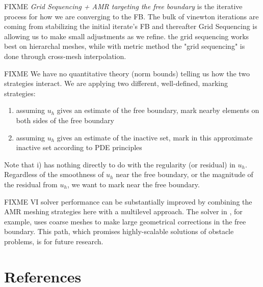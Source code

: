 \documentclass[]{interact}
\theoremstyle{plain}%
\theoremstyle{definition}
\theoremstyle{remark}
\begin{document}
FIXME \emph{Grid Sequencing + AMR targeting the free boundary} is the iterative process for how we are converging to the FB.  The bulk of vinewton iterations are coming from stabilizing the initial iterate's FB and thereafter Grid Sequencing is allowing us to make small adjustments as we refine.  the grid sequencing works best on hierarchal meshes, while with metric method the "grid sequencing" is done through cross-mesh interpolation.

FIXME We have no quantitative theory (norm bounds) telling us how the two strategies interact.  We are applying two different, well-defined, marking strategies:
\begin{enumerate}
\item assuming $u_h$ gives an estimate of the free boundary, mark nearby elements on both sides of the free boundary
\item assuming $u_h$ gives an estimate of the inactive set, mark in this approximate inactive set according to PDE principles
\end{enumerate}
Note that i) has nothing directly to do with the regularity (or residual) in $u_h$.  Regardless of the smoothness of $u_h$ near the free boundary, or the magnitude of the residual from $u_h$, we want to mark near the free boundary.

FIXME VI solver performance can be substantially improved by combining the AMR meshing strategies here with a multilevel approach.  The solver in \cite{BuelerFarrell2024}, for example, uses coarse meshes to make large geometrical corrections in the free boundary.  This path, which promises highly-scalable solutions of obstacle problems, is for future research.




\section{References}
\end{document}
